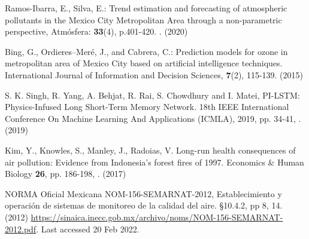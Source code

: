 \documentclass{llncs}
\begin{document}
\begin{thebibliography}{8}
    Ramos-Ibarra, E., Silva, E.: Trend estimation and forecasting of atmospheric pollutants in the Mexico City Metropolitan Area through a non-parametric perspective,
    Atmósfera: \textbf{33}(4), p.401-420. 
    .
    (2020)
    
    Bing, G., Ordieres–Meré, J., and Cabrera, C.:
    Prediction models for ozone in metropolitan area of Mexico City based on artificial intelligence techniques. 
    International Journal of Information and Decision Sciences, \textbf{7}(2), 115-139.
    (2015)
    
    S. K. Singh, R. Yang, A. Behjat, R. Rai, S. Chowdhury and I. Matei, 
    PI-LSTM: Physics-Infused Long Short-Term Memory Network.
    18th IEEE International Conference On Machine Learning And Applications (ICMLA), 2019, pp. 34-41, .
    (2019)
    
    Kim, Y., Knowles, S., Manley, J., Radoias, V. Long-run 
    health consequences of air pollution: Evidence from 
    Indonesia's forest fires of 1997. Economics \& Human Biology
    \textbf{26}, pp. 186-198, 
    .
    (2017)
    
    NORMA Oficial Mexicana NOM-156-SEMARNAT-2012, 
    Establecimiento y operación de sistemas de monitoreo
    de la calidad del aire. \S 10.4.2,
    pp 8, 14. (2012) 
    \url{https://sinaica.inecc.gob.mx/archivo/noms/NOM-156-SEMARNAT-2012.pdf}.
    Last accessed 20 Feb 2022.
    

    
    
    

\end{thebibliography}
\end{document}
